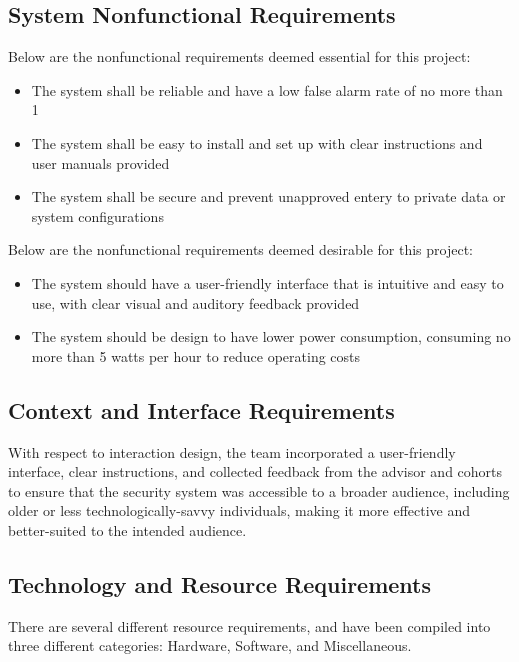 \subsection{System Nonfunctional Requirements}\label{subsec:system-nonfunctional-requirements}

Below are the nonfunctional requirements deemed essential for this project:
\begin{itemize}
    \item The system shall be reliable and have a low false alarm rate of no more than 1%
    \item The system shall be easy to install and set up with clear instructions and user manuals provided
    \item The system shall be secure and prevent unapproved entery to private data or system configurations
\end{itemize}

Below are the nonfunctional requirements deemed desirable for this project:
\begin{itemize}
    \item The system should have a user-friendly interface that is intuitive and easy to use, with clear visual and auditory feedback provided
    \item The system should be design to have lower power consumption, consuming no more than 5 watts per hour to reduce operating costs
\end{itemize}

\subsection{Context and Interface Requirements}\label{subsec:context-and-interface-requirements}

With respect to interaction design, the team incorporated a user-friendly interface, clear
instructions, and collected feedback from the advisor and cohorts to ensure that the
security system was accessible to a broader audience, including older or less
technologically-savvy individuals, making it more effective and better-suited to the
intended audience. %

\subsection{Technology and Resource Requirements}\label{subsec:technology-and-resource-requirements}

There are several different resource requirements, and have been compiled into three
different categories: Hardware, Software, and Miscellaneous. %

